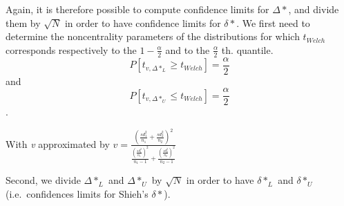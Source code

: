 \documentclass[man,floatsintext]{apa6}
\begin{document}
Again, it is therefore possible to compute confidence limits for \(\Delta*\), and divide them by \(\sqrt{N}\) in order to have confidence limits for \(\delta*\). We first need to determine the noncentrality parameters of the distributions for which \(t_{Welch}\) corresponds respectively to the \(1-\frac{\alpha}{2}\) and to the \(\frac{\alpha}{2}\) th. quantile.
\[P[t_{v, \Delta*_L} \geq t_{Welch}] = \frac{\alpha}{2} \] and
\[P[t_{v, \Delta*_U} \leq t_{Welch}] = \frac{\alpha}{2} \].

With \emph{v} approximated by \(v = \frac{(\frac{sd_1^2}{n_1}+\frac{sd_2^2}{n_2})^2}{\frac{(\frac{sd_1^2}{n_1})^2}{n_1-1}+\frac{(\frac{sd_2^2}{n_2})^2}{n_2-1}}\)

Second, we divide \(\Delta*_L\) and \(\Delta*_U\) by \(\sqrt{N}\) in order to have \(\delta*_L\) and \(\delta*_U\) (i.e.~confidences limits for Shieh's \(\delta*\)).
\end{document}
